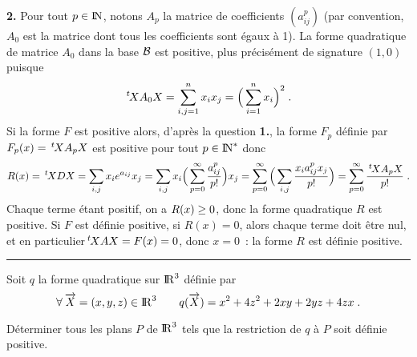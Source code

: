\documentclass{article}
\begin{document}
\msk
{\bf 2.} Pour tout $p\in{\rm I\kern-0.5mm N}$, notons $A_p$ la matrice de coefficients $(a_{ij}^p)$ (par convention, $A_0$ est la matrice dont tous les coefficients sont \'egaux \`a 1). La forme quadratique de matrice $A_0$ dans la base ${\cal B}$ est positive, plus pr\'ecis\'ement de signature $(1,0)$ puisque\vv
$$\,{}^t\!\!\>XA_0X=\sum_{i,j=1}^nx_ix_j=\Big(\sum_{i=1}^nx_i\Big)^2\;.$$
Si la forme $F$ est positive alors, d'apr\`es la question {\bf 1.}, la forme $F_p$ d\'efinie par\break $F_p(x)=\,{}^t\!\!\>XA_pX$ est positive pour tout $p\in{\rm I\kern-0.5mm N}^*$ donc\vv
$$R(x)=\,{}^t\!\!\>XDX=\sum_{i,j}x_ie^{a_{ij}}x_j=\sum_{i,j}x_i\Big(\sum_{p=0}^{\infty}{a_{ij}^p\over p!}\Big)x_j=\sum_{p=0}^{\infty}\Big(\sum_{i,j}{x_ia_{ij}^px_j\over p!}\Big)=\sum_{p=0}^{\infty}{\,{}^t\!\!\>XA_pX\over p!}\;.$$
Chaque terme \'etant positif, on a $R(x)\geq0$, donc la forme quadratique $R$ est positive.\msk\sect
Si $F$ est d\'efinie positive, si $R(x)=0$, alors chaque terme doit \^etre nul, et en particulier\break $\,{}^t\!\!\>XAX=F(x)=0$, donc $x=0$~: la forme $R$ est d\'efinie positive.


\bsk
\hrule
\bsk

Soit $q$ la forme quadratique sur ${\rm I\kern-0.6mm R}^3$ d\'efinie par\vv
$$\a \>\vect{X}=(x,y,z)\in\rmat^3\qquad q(\vect{X})=x^2+4z^2+2xy+2yz+4zx\;.$$\par
D\'eterminer tous les plans $P$ de ${\rm I\kern-0.6mm R}^3$ tels que la restriction de $q$ \`a $P$ soit d\'efinie positive.

\msk
\cl{- - - - - - - - - - - - - - - - - - - - - - - - - - - - - -}
\msk
\end{document}
